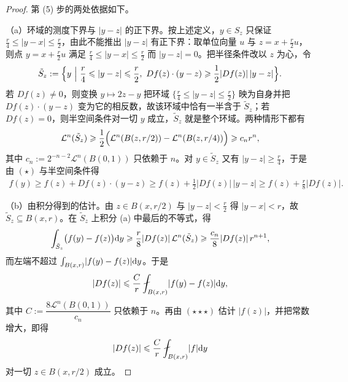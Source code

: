\documentclass[../../main.tex]{subfiles}%
\begin{document}
\begin{proof}
第 (5) 步的两处依据如下。

（a）环域的测度下界与 $\lvert y-z\rvert$ 的正下界。按上述定义，$y\in S_z$ 只保证 $\frac r4\leqslant\lvert y-x\rvert\leqslant\frac r2$，由此不能推出 $\lvert y-z\rvert$ 有正下界：取单位向量 $u$ 与 $z=x+\frac r2u$，则点 $y=x+\frac r2u$ 满足 $\frac r4\leqslant\lvert y-x\rvert\leqslant\frac r2$ 而 $\lvert y-z\rvert=0$。把半径条件改以 $z$ 为心，令
\begin{align*}
\tilde S_z:=\Bigl\{y\ \Big|\ \frac r4\leqslant\lvert y-z\rvert\leqslant\frac r2,\ Df(z)\cdot(y-z)\geqslant\frac12\lvert Df(z)\rvert\,\lvert y-z\rvert\Bigr\}.
\end{align*}
若 $Df(z)\neq0$，则变换 $y\mapsto2z-y$ 把环域 $\{\frac r4\leqslant\lvert y-z\rvert\leqslant\frac r2\}$ 映为自身并把 $Df(z)\cdot(y-z)$ 变为它的相反数，故该环域中恰有一半含于 $\tilde S_z$；若 $Df(z)=0$，则半空间条件对一切 $y$ 成立，$\tilde S_z$ 就是整个环域。两种情形下都有
\begin{align*}
\mathcal{L}^{n}(\tilde S_z)\geqslant\frac12\Bigl(\mathcal{L}^{n}(B(z,r/2))-\mathcal{L}^{n}(B(z,r/4))\Bigr)\geqslant c_nr^{n},
\end{align*}
其中 $c_n:=2^{-n-2}\mathcal{L}^{n}(B(0,1))$ 只依赖于 $n$。对 $y\in\tilde S_z$ 又有 $\lvert y-z\rvert\geqslant\frac r4$，于是由 $(\star)$ 与半空间条件得
\begin{align*}
f(y)\geqslant f(z)+Df(z)\cdot(y-z)\geqslant f(z)+\frac12\lvert Df(z)\rvert\,\lvert y-z\rvert\geqslant f(z)+\frac r8\lvert Df(z)\rvert .
\end{align*}

（b）由积分得到的估计。由 $z\in B(x,r/2)$ 与 $\lvert y-z\rvert<\frac r2$ 得 $\lvert y-x\rvert<r$，故 $\tilde S_z\subseteq B(x,r)$。在 $\tilde S_z$ 上积分 (a) 中最后的不等式，得
\begin{align*}
\int_{\tilde S_z}\bigl(f(y)-f(z)\bigr)\mathrm{d} y\geqslant\frac r8\lvert Df(z)\rvert\,\mathcal{L}^{n}(\tilde S_z)\geqslant\frac{c_n}{8}\lvert Df(z)\rvert\,r^{n+1},
\end{align*}
而左端不超过 $\int_{B(x,r)}\lvert f(y)-f(z)\rvert\mathrm{d} y$。于是
\begin{align*}
\lvert Df(z)\rvert\leqslant\frac{C}{r}\fint_{B(x,r)}\lvert f(y)-f(z)\rvert\diff y,
\end{align*}
其中 $C:=\dfrac{8\mathcal{L}^{n}(B(0,1))}{c_n}$ 只依赖于 $n$。再由 $(\star\star\star)$ 估计 $\lvert f(z)\rvert$，并把常数增大，即得
\begin{align*}
\lvert Df(z)\rvert\leqslant\frac Cr\fint_{B(x,r)}\lvert f\rvert\diff y
\end{align*}
对一切 $z\in B(x,r/2)$ 成立。


\end{proof}
\end{document}
